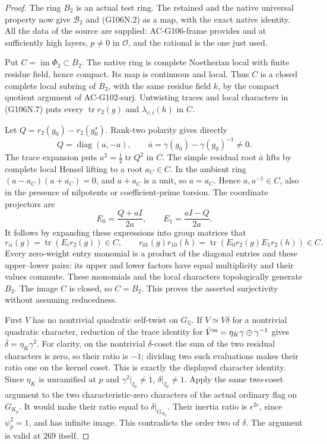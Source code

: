 \begin{proof}
The ring \(B_2\) is an actual  test ring.
The retained  and the native
universal property now give \(\mathscr B_2\) and
(G106N.2) as a map, with the exact native 
identity. All the data of the source 
are supplied: AC-G106-frame provides  and
 at sufficiently high layers, \(p\ne0\)
in \(\mathcal O\), and the rational 
is the one just used.

Put \(C=\operatorname{im}\Phi_2\subset B_2\).
The native ring is complete Noetherian local with finite
residue field, hence compact. Its map is continuous and
local. Thus \(C\) is a closed complete local subring
of \(B_2\), with the same residue field \(k\), by the
compact quotient argument of AC-G102-surj.
Untwisting traces and local characters in (G106N.7) puts
every \(\operatorname{tr}r_2(g)\) and
\(\lambda_{v,i}(h)\) in \(C\).

Let \(Q=r_2(g_0)-r_2(g_0^\star)\).
Rank-two polarity gives directly
\[
 Q=\operatorname{diag}(a,-a),\qquad
 \bar a=\gamma(g_0)-\gamma(g_0)^{-1}\ne0.
\tag{G106N.9}
\]
The trace expansion puts
\(a^2=\tfrac12\operatorname{tr}Q^2\) in \(C\).
The simple residual root \(\bar a\) lifts by complete
local Hensel lifting to a root \(a_C\in C\).
In the ambient ring
\((a-a_C)(a+a_C)=0\), and \(a+a_C\) is a unit,
so \(a=a_C\). Hence \(a,a^{-1}\in C\), also in
the presence of nilpotents or coefficient-prime torsion.
The coordinate projectors are
\[
                   E_0=\frac{Q+aI}{2a},\qquad
                   E_1=\frac{aI-Q}{2a}.
\tag{G106N.10}
\]
It follows by expanding these expressions into group
matrices that
\[
 r_{ii}(g)=\operatorname{tr}(E_i r_2(g))\in C,
 \qquad
 r_{01}(g)r_{10}(h)
       =\operatorname{tr}(E_0r_2(g)E_1r_2(h))\in C.
\tag{G106N.11}
\]
Every zero-weight entry monomial is a product of the
diagonal entries and these upper--lower pairs: its upper
and lower factors have equal multiplicity and their
values commute. These monomials and the local characters
topologically generate \(B_2\). The image \(C\) is
closed, so \(C=B_2\). This proves the asserted
surjectivity without assuming reducedness.


First \(V\) has no nontrivial quadratic self-twist on
\(G_{\mathbb Q}\). If \(V\simeq V\delta\) for a nontrivial
quadratic character, reduction of the trace identity for
\(\bar V^{\rm ss}=\eta_K\gamma\oplus\gamma^{-1}\)
gives \(\bar\delta=\eta_K\gamma^2\).
For clarity, on the nontrivial \(\delta\)-coset the sum
of the two residual characters is zero, so their ratio
is \(-1\); dividing two such evaluations makes their
ratio one on the kernel coset. This is exactly the
displayed character identity. Since \(\eta_K\) is
unramified at \(p\) and \(\gamma^2|_{I_p}\ne1\),
\(\delta|_{I_p}\ne1\). Apply the same two-coset argument
to the two characteristic-zero characters of the actual
ordinary flag on \(G_{K_p}\). It would make their ratio equal
to \(\delta|_{G_{K_p}}\). Their inertia ratio is
\(\epsilon^{2e}\), since \(\psi_p^2=1\), and has
infinite image. This contradicts the order two of
\(\delta\). The argument is valid at \(269\) itself.


\end{proof}
